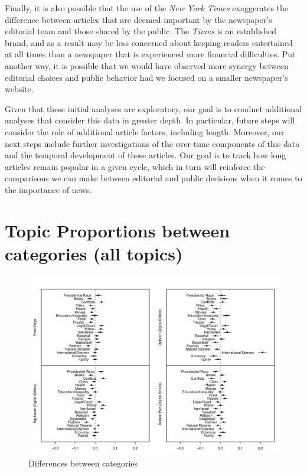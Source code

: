 \documentclass[12pt]{article}
\begin{document}
\begin{doublespace}
Finally, it is also possible that the use of the \textit{New York Times} exaggerates the difference between articles that are deemed important by the newspaper's editorial team and those shared by the public. The \textit{Times} is an established brand, and as a result may be less concerned about keeping readers entertained at all times than a newspaper that is experienced more financial difficulties.  Put another way, it is possible that we would have observed more synergy between editorial choices and public behavior had we focused on a smaller newspaper's website.

Given that these initial analyses are exploratory, our goal is to conduct additional analyses that consider this data in greater depth. In particular, future steps will consider the role of additional article factors, including length.  Moreover, our next steps include further investigations of the over-time components of this data and the temporal development of these articles.  Our goal is to track how long articles remain popular in a given cycle, which in turn will reinforce the comparisons we can make between editorial and public decisions when it comes to the importance of news.




\clearpage




\end{doublespace}

\clearpage
\footnotesize\singlespacing
\appendices

\section{Topic Proportions between categories (all topics)}\label{app:res}
\renewcommand\thefigure{\thesection.\arabic{figure}}
\renewcommand\thetable{\thesection.\arabic{table}}
\setcounter{figure}{0}
\setcounter{table}{0}

\begin{figure}[h]
\caption{Differences between categories}\label{fig:res_nyt}
\includegraphics[width=\textwidth]{../calc/fig/res_nyt}
\end{figure}
\end{document}
